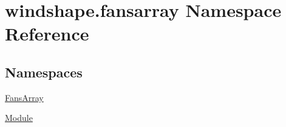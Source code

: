\hypertarget{namespacewindshape_1_1fansarray}{}\section{windshape.\+fansarray Namespace Reference}
\label{namespacewindshape_1_1fansarray}
\subsection*{Namespaces}
\begin{DoxyCompactItemize}
\item 
 \mbox{\hyperlink{namespacewindshape_1_1fansarray_1_1_fans_array}{Fans\+Array}}
\item 
 \mbox{\hyperlink{namespacewindshape_1_1fansarray_1_1_module}{Module}}
\end{DoxyCompactItemize}
